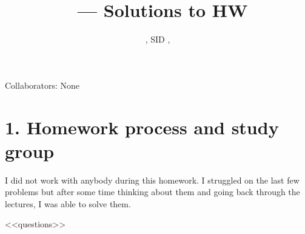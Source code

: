 \documentclass[11pt]{article}
\title{\Session\ \Class --- Solutions to HW \Homework}
\author{\Name, SID \SID, \texttt{\Login}}
\begin{document}
\maketitle

Collaborators: None

\section*{1. Homework process and study group}
I did not work with anybody during this homework. I struggled on the last few
problems but after some time thinking about them and going back through the
lectures, I was able to solve them.
\newpage

<<questions>>
% 
\end{document}
